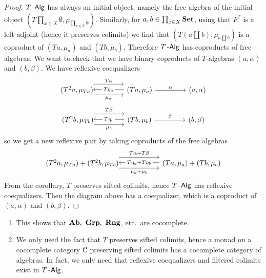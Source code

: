 \documentclass[a4paper,11pt,oneside,openany]{scrbook}
\begin{document}
\begin{proof}
	$T\operatorname{-\mathsf{Alg}}$ has always an initial object, namely the free algebra of the initial
	object $\left(T\prod_{x\in X}\emptyset,\mu_{\prod_{x\in
				X}\emptyset}\right)$. Similarly, for $a,b\in\prod_{x\in X}{\normalfont\textbf{Set}}$, using that
	$F^T$ is a left adjoint (hence it preserves colimits) we find that
	$\left(T\left(a\coprod b\right),\mu_{a\coprod b}\right)$ is a coproduct of
	$(Ta,\mu_a)$ and $(Tb,\mu_b)$. Therefore $T\operatorname{-\mathsf{Alg}}$ has coproducts of free
	algebras. We want to check that we have binary coproducts of $T$-algebras
	$(a,\alpha)$ and $(b,\beta)$. We have reflexive coequalizers
	\[
		\begin{tikzcd}[column sep=1.5cm]
			(T^2a,\mu_{Ta})\hspace{-1.5mm}\arrow[r, shift right=1.5ex, "\mu_a"']  \arrow[r, shift left=2ex, "T\alpha"] & (Ta,\mu_a)\arrow[l, shift right=.25ex, "T\eta_a"description]\arrow[r,"\alpha"]&(a,\alpha)
		\end{tikzcd}
	\]
	\[
		\begin{tikzcd}[column sep=1.5cm]
			(T^2b,\mu_{Tb})\hspace{-1.5mm}\arrow[r, shift right=1.5ex, "\mu_b"']  \arrow[r, shift left=2ex, "T\beta"] & (Tb,\mu_b)\arrow[l, shift right=.25ex, "T\eta_b"description]\arrow[r,"\beta"]&(b,\beta)
		\end{tikzcd}
	\]
	so we get a new reflexive pair by taking coproducts of the free algebras
	\[
		\begin{tikzcd}[column sep=2.0cm]
			(T^2a,\mu_{Ta})+(T^2b,\mu_{Tb})\hspace{-1.5mm}\arrow[r, shift right=1.5ex, "\mu_a+\mu_b"']  \arrow[r, shift left=2ex, "T\alpha+T\beta"] & (Ta,\mu_a)+(Tb,\mu_b)\arrow[l, shift right=.25ex, "T\eta_a+T\eta_b" description]
		\end{tikzcd}
	\]
	From the corollary, $T$ preserves sifted colimits, hence $T\operatorname{-\mathsf{Alg}}$ has reflexive coequalizers. Then the diagram above has a coequalizer, which is a coproduct of $(a,\alpha)$ and $(b,\beta)$.
\end{proof}
\begin{rmk}
	\begin{enumerate}
		\item This shows that $\Ab,\ \mathbf{Grp},\ \mathbf{Rng}$, etc.\ are cocomplete.
		\item We only used the fact that $T$ preserves sifted colimits, hence a
		      monad on a cocomplete category $\operatorname{\mathcal{C}}$ preserving sifted colimits has a
		      cocomplete category of algebras. In fact, we only need that
		      reflexive coequalizers and filtered colimits exist in $T\operatorname{-\mathsf{Alg}}$.
	\end{enumerate}
\end{rmk}
\end{document}
